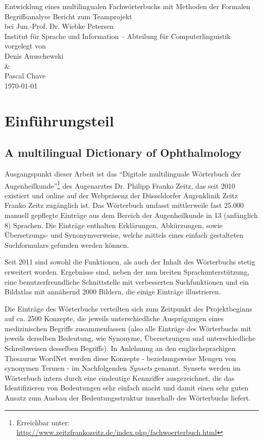 \documentclass[pagesize,paper=A4,DIV=calc,fontsize=12pt,draft=false]{scrreprt}
\begin{document}
\begin{titlepage}
\begin{center}
\vfill
\LARGE
Entwicklung eines multilingualen Fachwörterbuchs mit Methoden der Formalen Begriffsanalyse
\vfill 
\Large
Bericht zum Teamprojekt\\
bei Jun.-Prof. Dr. Wiebke Petersen\\
\vfill
\large
Institut für Sprache und Information -- Abteilung für Computerlinguistik
\vfill
\normalsize
vorgelegt von \\ Denis Anuschewski \\ \& \\ Pascal Chave \\
\vfill
\today
\vfill
\end{center}
\end{titlepage}

\tableofcontents

\chapter{Einführungsteil}

\section{A multilingual Dictionary of Ophthalmology}

Ausgangspunkt dieser Arbeit ist das \enquote{Digitale multilinguale Wörterbuch der Augenheilkunde}\footnote{Erreichbar unter: \href{http://www.zeitzfrankozeitz.de/index.php/fachwoerterbuch.html}{http://www.zeitzfrankozeitz.de/index.php/fachwoerterbuch.html}} des Augenarztes Dr. Philipp Franko Zeitz, das seit 2010 existiert und online auf der Webpräsenz der Düsseldorfer Augenklinik Zeitz Franko Zeitz zugänglich ist. 
Das Wörterbuch umfasst mittlerweile fast 25.000 manuell gepflegte Einträge aus dem Bereich der Augenheilkunde in 13 (anfänglich 8) Sprachen. 
Die Einträge enthalten Erklärungen, Abkürzungen, sowie Übersetzungs- und Synonymverweise, welche mittels eines einfach gestalteten Suchformulars gefunden werden können. 

Seit 2011 sind sowohl die Funktionen, als auch der Inhalt des Wörterbuchs stetig erweitert worden.
Ergebnisse sind, neben der nun breiten Sprachunterstützung, eine benutzerfreundliche Schnittstelle mit verbesserten Suchfunktionen und ein Bildatlas mit annähernd 2000 Bildern, die einige Einträge illustrieren. 

Die Einträge des Wörterbuchs verteilten sich zum Zeitpunkt des Projektbeginns auf ca. 2500 Konzepte, die jeweils unterschiedliche Ausprägungen eines medizinischen Begriffs zusammenfassen (also alle Einträge des Wörterbuchs mit jeweils derselben Bedeutung, wie Synonyme, Übersetzungen und unterschiedliche Schreibweisen desselben Begriffs). 
In Anlehnung an den englischsprachigen Thesaurus WordNet werden diese Konzepte - beziehungsweise Mengen von synonymen Termen - im Nachfolgenden \emph{Synsets} genannt. 
Synsets werden im Wörterbuch intern durch eine eindeutige Kennziffer ausgezeichnet, die das Identifizieren von Bedeutungen sehr einfach macht und damit einen sehr guten Ansatz zum Ausbau der Bedeutungsstruktur innerhalb des Wörterbuchs liefert.
\end{document}
